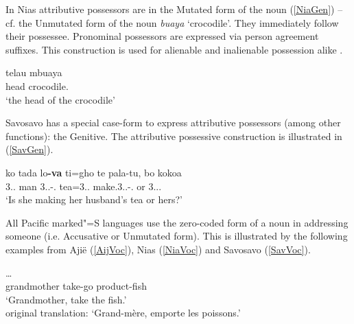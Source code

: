 In Nias attributive possessors are in the Mutated form of the noun (\ref{NiaGen}) -- cf. the Unmutated form of the noun \emph{buaya} `crocodile'. %
They immediately follow their possessee. Pronominal possessors are expressed via person agreement suffixes. 
This construction is used for alienable and inalienable possession alike \citep[374]{Brown:2001}.

\begin{exe}
\ex\label{NiaGen}
\gll telau mbuaya\\
head crocodile.\mut{}\\
\glt `the head of the crocodile'
\end{exe}

Savosavo has a special case-form to express attributive possessors (among other functions): the Genitive.
The attributive possessive construction is illustrated in (\ref{SavGen}).
\enlargethispage{\baselineskip}
\begin{exe}\ex\label{SavGen}
\raggedright
\gll ko tada lo\textbf{-va} ti=gho te pala-tu, bo kokoa\\
3\sg{}.\fem{}.\gen{} man 3.\sg{}.\mas{}-\gen{}.\mas{} tea=3\sg{}.\fem{}.\nom{} \emphat{} make.3\sg{}.\mas.\obj-\prs.\ipfv{} or 3\sg{}.\fem{}.\poss{}.\mas{}\\
\glt `Is she making her husband's tea or hers?'
\end{exe}

All Pacific marked"=S languages use the zero-coded form of a noun in addressing someone (i.e. Accusative or Unmutated form).
This is illustrated by the following examples from Aji\"e (\ref{AijVoc}), Nias (\ref{NiaVoc}) and Savosavo (\ref{SavVoc}).

\pagebreak
\begin{exe}\ex\label{AijVoc}
\gll\textbf{}    \dots\\
grandmother take-go \pl{} product-fish\\
\glt `Grandmother, take the fish.'\\
 original translation: `Grand-m\`ere, emporte les poissons.'
\end{exe}

